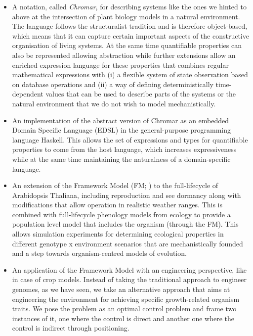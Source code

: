 \begin{itemize}
\item A notation, called \emph{Chromar}, for describing systems like the ones
  we hinted to above at the intersection of plant biology models in a natural
  environment. The language follows the structuralist tradition and is therefore
  object-based, which means that it can capture certain important aspects of the
  constructive organisation of living systems. At the same time quantifiable
  properties can also be represented allowing abstraction while further
  extensions allow an enriched expression language for these properties that
  combines regular mathematical expressions with (i) a flexible system of state
  observation based on database operations and (ii) a way of defining
  deterministically time-dependent values that can be used to describe parts of
  the systems or the natural environment that we do not wish to model
  mechanistically.
\item An implementation of the abstract version of Chromar as an embedded Domain
  Specific Language (EDSL) in the general-purpose programming language
  Haskell. This allows the set of expressions and types for quantifiable
  properties to come from the host language, which increases expressiveness while
  at the same time maintaining the naturalness of a domain-specific language.
\item An extension of the Framework Model (FM; ) to the full-lifecycle
  of Arabidopsis Thaliana, including reproduction and see dormancy along with
  modifications that allow operation in realistic weather ranges. This is
  combined with full-lifecycle phenology models from ecology to provide a
  population level model that includes the organism (through the FM). This
  allows simulation experiments for determining ecological properties in
  different genotype x environment scenarios that are mechanistically founded
  and a step towards organism-centred models of evolution.
\item An application of the Framework Model with an engineering perspective,
  like in case of crop models. Instead of taking the traditional approach to
  engineer genomes, as we have seen, we take an alternative approach that aims
  at engineering the environment for achieving specific growth-related organism
  traits. We pose the problem as an optimal control problem and frame two
  instances of it, one where the control is direct and another one where the
  control is indirect through positioning.
\end{itemize}
